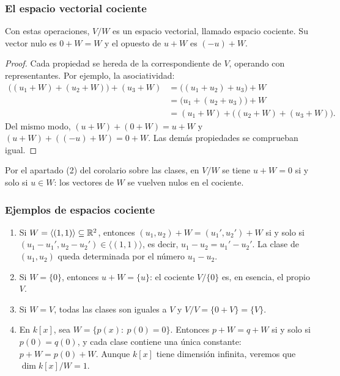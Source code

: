 \begin{frame}
    \frametitle{El espacio vectorial cociente}

    \begin{theorem}
        Con estas operaciones, $V/W$ es un espacio vectorial, llamado
        \alert{espacio cociente}. Su vector nulo es $0+W=W$ y el opuesto de
        $u+W$ es $(-u)+W$.
    \end{theorem}

    \begin{proof}
        Cada propiedad se hereda de la correspondiente de $V$, operando con
        representantes. Por ejemplo, la asociatividad:
        \begin{align*}
            \bigl((u_1+W)+(u_2+W)\bigr)+(u_3+W)
            &=\bigl((u_1+u_2)+u_3\bigr)+W\\
            &=\bigl(u_1+(u_2+u_3)\bigr)+W\\
            &=(u_1+W)+\bigl((u_2+W)+(u_3+W)\bigr).
        \end{align*}
        Del mismo modo, $(u+W)+(0+W)=u+W$ y $(u+W)+((-u)+W)=0+W$. Las
        demás propiedades se comprueban igual.
    \end{proof}

    \medskip

    Por el apartado (2) del corolario sobre las clases, en $V/W$ se tiene $u+W=0$ si y solo si
    $u\in W$: \alert{los vectores de $W$ se vuelven nulos} en el cociente.
\end{frame}


\begin{frame}
    \frametitle{Ejemplos de espacios cociente}

    \begin{example}
        \begin{enumerate}
            \item Si $W=\langle(1,1)\rangle\subseteq\mathbb{R}^2$, entonces
            $(u_1,u_2)+W=(u_1',u_2')+W$
            si y solo si $(u_1-u_1',u_2-u_2')\in\langle(1,1)\rangle$, es
            decir, $u_1-u_2=u_1'-u_2'$. La clase de $(u_1,u_2)$ queda
            determinada por el número $u_1-u_2$.
            \item Si $W=\{0\}$, entonces $u+W=\{u\}$: el cociente $V/\{0\}$
            es, en esencia, el propio $V$. 
            \item Si $W=V$, todas las clases son
            iguales a $V$ y $V/V=\{0+V\}=\{V\}$.
            \item En $k[x]$, sea $W=\{p(x):\ p(0)=0\}$. Entonces
            $p+W=q+W$ si y solo si $p(0)=q(0)$, y cada clase contiene una
            única constante: $p+W=p(0)+W$. Aunque $k[x]$ tiene dimensión infinita, veremos que $\dim k[x]/W=1$.
        \end{enumerate}
    \end{example}
\end{frame}



